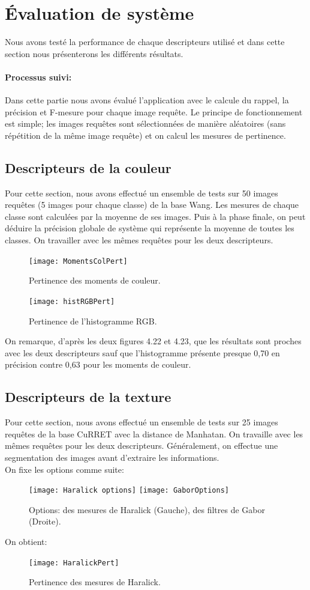 \section{Évaluation de système}
Nous avons testé la performance de chaque descripteurs utilisé et dans cette section nous présenterons les différents résultats.

\paragraph{Processus suivi:}
Dans cette partie nous avons évalué l’application avec le calcule du rappel, la précision et F-mesure pour chaque image requête. Le principe de fonctionnement est simple; les images requêtes sont sélectionnées de manière aléatoires (sans répétition de la même image requête) et on calcul les mesures de pertinence. 
\subsection{Descripteurs de la couleur}
Pour cette section, nous avons effectué un ensemble de tests sur 50 images requêtes (5 images pour chaque classe) de la base Wang. Les mesures de chaque classe sont calculées par la moyenne de ses images. Puis à la phase finale, on peut déduire la précision globale de système qui représente la moyenne de toutes les classes. On travailler avec les mêmes requêtes pour les deux descripteurs.

\begin{figure}[H]
	\centering
	\texttt{[image: MomentsColPert]} 
	\caption{Pertinence des moments de couleur.}
\end{figure}

\begin{figure}[H]
	\centering
	\texttt{[image: histRGBPert]} 
	\caption{Pertinence de l'histogramme RGB.}
\end{figure}
On remarque, d'après les deux figures 4.22 et 4.23, que les résultats sont proches avec les deux descripteurs sauf que l'histogramme présente presque 0,70 en précision contre 0,63 pour les moments de couleur.
\subsection{Descripteurs de la texture}
Pour cette section, nous avons effectué un ensemble de tests sur 25 images requêtes de la base CuRRET avec la distance de Manhatan. On travaille avec les mêmes requêtes pour les deux descripteurs. Généralement, on effectue une segmentation des images avant d'extraire les informations.\\
On fixe les options comme suite:
\begin{figure}[H]
	\centering
	\texttt{[image: Haralick options]} \space
	\texttt{[image: GaborOptions]} 
	\caption{Options: des mesures de Haralick (Gauche),  des filtres de Gabor (Droite).}
\end{figure}
On obtient:
\begin{figure}[H]
	\centering
	\texttt{[image: HaralickPert]} 
	\caption{Pertinence des mesures de Haralick.}
\end{figure}




